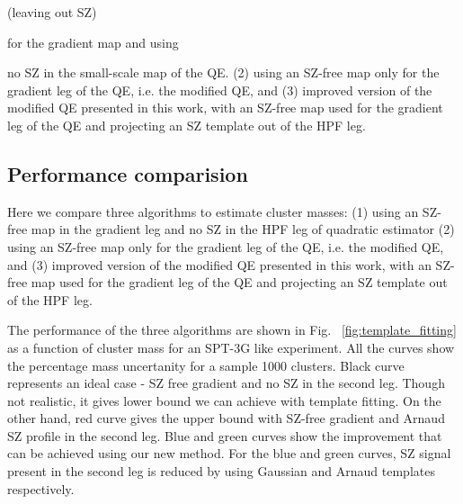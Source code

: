 {(leaving out SZ)

for the gradient map and using 


no SZ in the small-scale map of the QE. 
(2) using an SZ-free map only for the gradient leg of the QE, i.e. the modified QE, 
 and (3) improved version of the modified QE presented in this work, with an SZ-free map used for the gradient leg of the QE and projecting an SZ template out of the  HPF leg.
 
 \subsection{Performance comparision} 
Here we compare three algorithms to estimate cluster masses:  
(1) using an SZ-free map in the gradient leg and no SZ in the HPF leg of quadratic estimator
(2) using an SZ-free map only for the gradient leg of the QE, i.e. the modified QE, 
 and (3) improved version of the modified QE presented in this work, with an SZ-free map used for the gradient leg of the QE and projecting an SZ template out of the  HPF leg. 


The performance of the three algorithms are shown in Fig. ~\ref{fig:template_fitting} as a function of cluster mass for an SPT-3G like experiment.
 All the curves show the percentage mass uncertanity for a sample 1000 clusters. 
Black curve represents an ideal case - SZ free gradient and no SZ in the second leg.
Though not realistic, it gives lower bound we can achieve with template fitting. 
On the other hand, red curve gives the upper bound with SZ-free gradient and Arnaud SZ profile in the second leg.
Blue and green curves show the improvement that can be achieved using our new method. 
For the blue and green curves, SZ signal present in the second leg is reduced by using Gaussian and Arnaud templates respectively.


}
